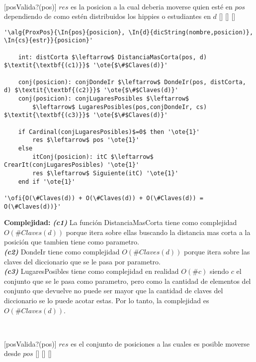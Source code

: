 ~

[posValida?(pos)]
{$res$ es la posicion a la cual deberia moverse quien esté en $pos$ dependiendo de como estén distribuidos los hippies o estudiantes en $d$}
[]
[]
[]

\begin{lstlisting}[mathescape]
'\alg{ProxPos}{\In{pos}{posicion}, \In{d}{dicString(nombre,posicion)}, \In{cs}{estr}}{posicion}'

	int: distCorta $\leftarrow$ DistanciaMasCorta(pos, d) $\textit{\textbf{(c1)}}$ '\ote{$\#$Claves(d)}'

	conj(posicion): conjDondeIr $\leftarrow$ DondeIr(pos, distCorta, d) $\textit{\textbf{(c2)}}$ '\ote{$\#$Claves(d)}'
	conj(posicion): conjLugaresPosibles $\leftarrow$
		$\leftarrow$ LugaresPosibles(pos,conjDondeIr, cs) $\textit{\textbf{(c3)}}$ '\ote{$\#$Claves(d)}'

	if Cardinal(conjLugaresPosibles)$=0$ then '\ote{1}'
		res $\leftarrow$ pos '\ote{1}'
	else
		itConj(posicion): itC $\leftarrow$ CrearIt(conjLugaresPosibles) '\ote{1}'
		res $\leftarrow$ Siguiente(itC) '\ote{1}'
	end if '\ote{1}'

'\ofi{O(\#Claves(d)) + O(\#Claves(d)) + O(\#Claves(d)) = O(\#Claves(d))}'
\end{lstlisting}

\textbf{Complejidad:} \textit{\textbf{(c1)}} La función DistanciaMasCorta tiene como complejidad $O(\#Claves(d))$ porque itera sobre ellas buscando la distancia mas corta a la posición que tambien tiene como parametro. \\
\textit{\textbf{(c2)}} DondeIr tiene como complejidad $O(\#Claves(d))$ porque itera sobre las claves del diccionario que se le pasa por parametro. \\
\textit{\textbf{(c3)}} LugaresPosibles tiene como complejidad en realidad $O(\#c)$ siendo $c$ el conjunto que se le pasa como parametro, pero como la cantidad de elementos del conjunto que devuelve no puede ser mayor que la cantidad de claves del diccionario se lo puede acotar estas. Por lo tanto, la complejidad es $O(\#Claves(d))$.

~

[posValida?(pos)]
{$res$ es el conjunto de posiciones a las cuales es posible moverse desde $pos$}
[]
[]
[]

